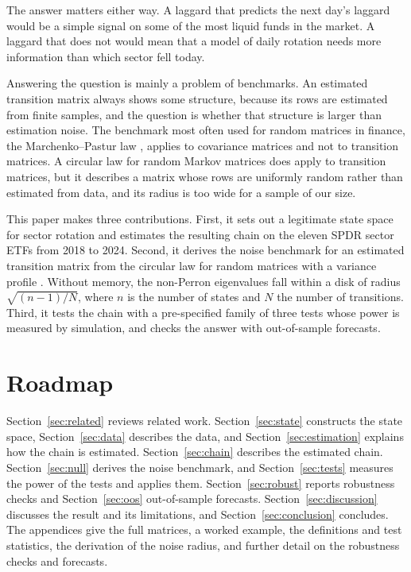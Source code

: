 \documentclass[11pt]{article}
\begin{document}
The answer matters either way. A laggard that predicts the next day's laggard would be a simple signal on some of the most liquid funds in the market. A laggard that does not would mean that a model of daily rotation needs more information than which sector fell today.

Answering the question is mainly a problem of benchmarks. An estimated transition matrix always shows some structure, because its rows are estimated from finite samples, and the question is whether that structure is larger than estimation noise. The benchmark most often used for random matrices in finance, the Marchenko--Pastur law \cite{marchenkopastur1967}, applies to covariance matrices and not to transition matrices. A circular law for random Markov matrices \cite{bordenave2012} does apply to transition matrices, but it describes a matrix whose rows are uniformly random rather than estimated from data, and its radius is too wide for a sample of our size.

This paper makes three contributions. First, it sets out a legitimate state space for sector rotation and estimates the resulting chain on the eleven SPDR sector ETFs from 2018 to 2024. Second, it derives the noise benchmark for an estimated transition matrix from the circular law for random matrices with a variance profile \cite{cooketal2018}. Without memory, the non-Perron eigenvalues fall within a disk of radius $\sqrt{(n-1)/N}$, where $n$ is the number of states and $N$ the number of transitions. Third, it tests the chain with a pre-specified family of three tests whose power is measured by simulation, and checks the answer with out-of-sample forecasts.

\section{Roadmap}

Section~\ref{sec:related} reviews related work. Section~\ref{sec:state} constructs the state space, Section~\ref{sec:data} describes the data, and Section~\ref{sec:estimation} explains how the chain is estimated. Section~\ref{sec:chain} describes the estimated chain. Section~\ref{sec:null} derives the noise benchmark, and Section~\ref{sec:tests} measures the power of the tests and applies them. Section~\ref{sec:robust} reports robustness checks and Section~\ref{sec:oos} out-of-sample forecasts. Section~\ref{sec:discussion} discusses the result and its limitations, and Section~\ref{sec:conclusion} concludes. The appendices give the full matrices, a worked example, the definitions and test statistics, the derivation of the noise radius, and further detail on the robustness checks and forecasts.
\end{document}
